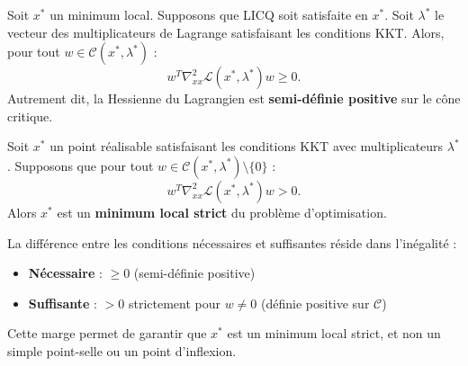 \begin{theoreme}
    Soit $x^*$ un minimum local. Supposons que LICQ soit satisfaite en $x^*$. Soit $\lambda^*$ le vecteur des multiplicateurs de Lagrange satisfaisant les conditions KKT. Alors, pour tout $w \in \mathcal{C}(x^*, \lambda^*)$ :
    \begin{equation}
        w^T \nabla_{xx}^2 \mathcal{L}(x^*, \lambda^*) w \geq 0.
    \end{equation}
    Autrement dit, la Hessienne du Lagrangien est \textbf{semi-définie positive} sur le cône critique.
\end{theoreme}

\begin{theoreme}
    Soit $x^*$ un point réalisable satisfaisant les conditions KKT avec multiplicateurs $\lambda^*$. Supposons que pour tout $w \in \mathcal{C}(x^*, \lambda^*) \setminus \{0\}$ :
    \begin{equation}
        w^T \nabla_{xx}^2 \mathcal{L}(x^*, \lambda^*) w > 0.
    \end{equation}
    Alors $x^*$ est un \textbf{minimum local strict} du problème d'optimisation.
\end{theoreme}

\begin{remarque}
    La différence entre les conditions nécessaires et suffisantes réside dans l'inégalité :
    \begin{itemize}
        \item \textbf{Nécessaire} : $\geq 0$ (semi-définie positive)
        \item \textbf{Suffisante} : $> 0$ strictement pour $w \neq 0$ (définie positive sur $\mathcal{C}$)
    \end{itemize}
    Cette marge permet de garantir que $x^*$ est un minimum local strict, et non un simple point-selle ou un point d'inflexion.
\end{remarque}

